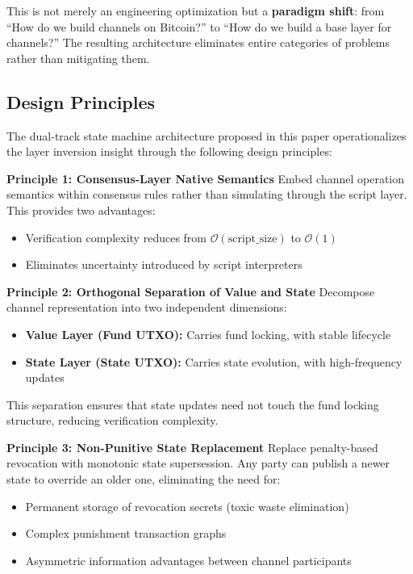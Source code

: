 \documentclass[11pt,a4paper]{article}
\newcommand{\bigO}{\mathcal{O}} %
\begin{document}
This is not merely an engineering optimization but a \textbf{paradigm shift}: from ``How do we build channels on Bitcoin?'' to ``How do we build a base layer for channels?'' The resulting architecture eliminates entire categories of problems rather than mitigating them.

\subsection{Design Principles}

The dual-track state machine architecture proposed in this paper operationalizes the layer inversion insight through the following design principles:

\textbf{Principle 1: Consensus-Layer Native Semantics}
Embed channel operation semantics within consensus rules rather than simulating through the script layer. This provides two advantages:
\begin{itemize}
    \item Verification complexity reduces from $\bigO(\text{script\_size})$ to $\bigO(1)$
    \item Eliminates uncertainty introduced by script interpreters
\end{itemize}

\textbf{Principle 2: Orthogonal Separation of Value and State}
Decompose channel representation into two independent dimensions:
\begin{itemize}
    \item \textbf{Value Layer (Fund UTXO):} Carries fund locking, with stable lifecycle
    \item \textbf{State Layer (State UTXO):} Carries state evolution, with high-frequency updates
\end{itemize}

This separation ensures that state updates need not touch the fund locking structure, reducing verification complexity.

\textbf{Principle 3: Non-Punitive State Replacement}
Replace penalty-based revocation with monotonic state supersession. Any party can publish a newer state to override an older one, eliminating the need for:
\begin{itemize}
    \item Permanent storage of revocation secrets (toxic waste elimination)
    \item Complex punishment transaction graphs
    \item Asymmetric information advantages between channel participants
\end{itemize}
\end{document}
